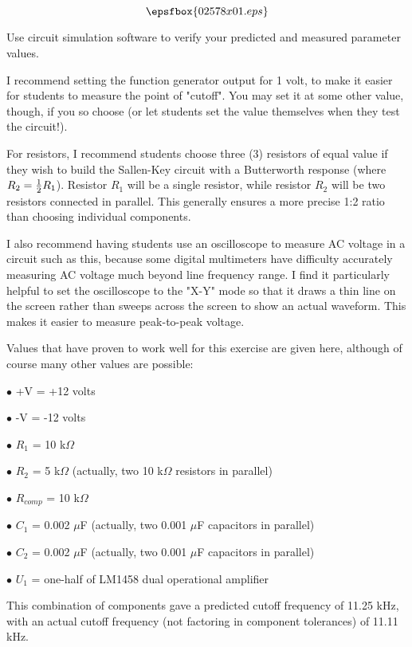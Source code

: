 

$$\epsfbox{02578x01.eps}$$

\vfil \eject






Use circuit simulation software to verify your predicted and measured parameter values.







I recommend setting the function generator output for 1 volt, to make it easier for students to measure the point of "cutoff".  You may set it at some other value, though, if you so choose (or let students set the value themselves when they test the circuit!).

For resistors, I recommend students choose three (3) resistors of equal value if they wish to build the Sallen-Key circuit with a Butterworth response (where $R_2 = {1 \over 2} R_1$).  Resistor $R_1$ will be a single resistor, while resistor $R_2$ will be two resistors connected in parallel.  This generally ensures a more precise 1:2 ratio than choosing individual components.

I also recommend having students use an oscilloscope to measure AC voltage in a circuit such as this, because some digital multimeters have difficulty accurately measuring AC voltage much beyond line frequency range.  I find it particularly helpful to set the oscilloscope to the "X-Y" mode so that it draws a thin line on the screen rather than sweeps across the screen to show an actual waveform.  This makes it easier to measure peak-to-peak voltage.

Values that have proven to work well for this exercise are given here, although of course many other values are possible:

\medskip
\goodbreak
\item{$\bullet$} +V = +12 volts
\item{$\bullet$} -V = -12 volts
\item{$\bullet$} $R_1$ = 10 k$\Omega$
\item{$\bullet$} $R_2$ = 5 k$\Omega$ (actually, two 10 k$\Omega$ resistors in parallel)
\item{$\bullet$} $R_{comp}$ = 10 k$\Omega$
\item{$\bullet$} $C_1$ = 0.002 $\mu$F (actually, two 0.001 $\mu$F capacitors in parallel)
\item{$\bullet$} $C_2$ = 0.002 $\mu$F (actually, two 0.001 $\mu$F capacitors in parallel)
\item{$\bullet$} $U_1$ = one-half of LM1458 dual operational amplifier
\medskip

This combination of components gave a predicted cutoff frequency of 11.25 kHz, with an actual cutoff frequency (not factoring in component tolerances) of 11.11 kHz.




